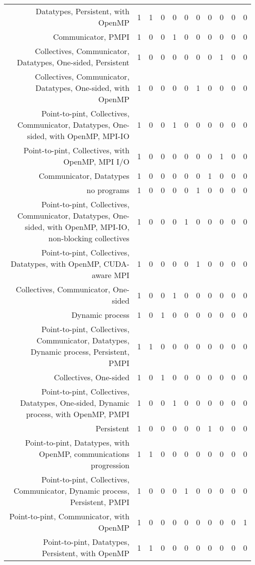 {\begin{landscape}
\begin{longtable}[htb]{r|c|c|c|c|c|c|c|c|c|c}
{Datatypes, Persistent, with OpenMP} & 1 & 1 & 0 & 0 & 0 & 0 & 0 & 0 & 0 & 0 \\%
{Communicator, PMPI} & 1 & 0 & 0 & 1 & 0 & 0 & 0 & 0 & 0 & 0 \\%
{Collectives, Communicator, Datatypes, One-sided, Persistent} & 1 & 0 & 0 & 0 & 0 & 0 & 0 & 1 & 0 & 0 \\%
{Collectives, Communicator, Datatypes, One-sided, with OpenMP} & 1 & 0 & 0 & 0 & 0 & 1 & 0 & 0 & 0 & 0 \\%
{Point-to-pint, Collectives, Communicator, Datatypes, One-sided, with OpenMP, MPI-IO} & 1 & 0 & 0 & 1 & 0 & 0 & 0 & 0 & 0 & 0 \\%
{Point-to-pint, Collectives, with OpenMP, MPI I/O} & 1 & 0 & 0 & 0 & 0 & 0 & 0 & 1 & 0 & 0 \\%
{Communicator, Datatypes} & 1 & 0 & 0 & 0 & 0 & 0 & 1 & 0 & 0 & 0 \\%
{no programs} & 1 & 0 & 0 & 0 & 0 & 1 & 0 & 0 & 0 & 0 \\%
{Point-to-pint, Collectives, Communicator, Datatypes, One-sided, with OpenMP, MPI-IO, non-blocking collectives} & 1 & 0 & 0 & 0 & 1 & 0 & 0 & 0 & 0 & 0 \\%
{Point-to-pint, Collectives, Datatypes, with OpenMP, CUDA-aware MPI} & 1 & 0 & 0 & 0 & 0 & 1 & 0 & 0 & 0 & 0 \\%
{Collectives, Communicator, One-sided} & 1 & 0 & 0 & 1 & 0 & 0 & 0 & 0 & 0 & 0 \\%
{Dynamic process} & 1 & 0 & 1 & 0 & 0 & 0 & 0 & 0 & 0 & 0 \\%
{Point-to-pint, Collectives, Communicator, Datatypes, Dynamic process, Persistent, PMPI} & 1 & 1 & 0 & 0 & 0 & 0 & 0 & 0 & 0 & 0 \\%
{Collectives, One-sided} & 1 & 0 & 1 & 0 & 0 & 0 & 0 & 0 & 0 & 0 \\%
{Point-to-pint, Collectives, Datatypes, One-sided, Dynamic process, with OpenMP, PMPI} & 1 & 0 & 0 & 1 & 0 & 0 & 0 & 0 & 0 & 0 \\%
{Persistent} & 1 & 0 & 0 & 0 & 0 & 0 & 1 & 0 & 0 & 0 \\%
{Point-to-pint, Datatypes, with OpenMP, communications progression} & 1 & 1 & 0 & 0 & 0 & 0 & 0 & 0 & 0 & 0 \\%
{Point-to-pint, Collectives, Communicator, Dynamic process, Persistent, PMPI} & 1 & 0 & 0 & 0 & 1 & 0 & 0 & 0 & 0 & 0 \\%
{Point-to-pint, Communicator, with OpenMP} & 1 & 0 & 0 & 0 & 0 & 0 & 0 & 0 & 0 & 1 \\%
{Point-to-pint, Datatypes, Persistent, with OpenMP} & 1 & 1 & 0 & 0 & 0 & 0 & 0 & 0 & 0 & 0 \\%

\end{longtable}
\end{landscape}}
